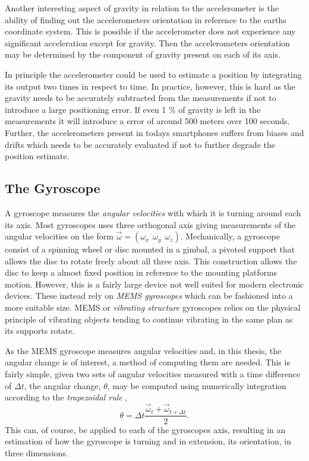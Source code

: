 \documentclass{LTHthesis}
\begin{document}
Another interesting aspect of gravity in relation to the accelerometer is the ability of finding out the accelerometers orientation in reference to the earths coordinate system. This is possible if the accelerometer does not experience any significant acceleration except for gravity. Then the accelerometers orientation may be determined by the component of gravity present on each of its axis. 

In principle the accelerometer could be used to estimate a position by integrating its output two times in respect to time. In practice, however, this is hard as the gravity needs to be accurately subtracted from the measurements if not to introduce a large positioning error. If even 1 \% of gravity is left in the measurements it will introduce a error of around 500 meters over 100 seconds. Further, the accelerometers present in todays smartphones suffers from biases and drifts which needs to be accurately evaluated if not to further degrade the position estimate. 
%
\subsection{The Gyroscope}
%
A gyroscope measures the \emph{angular velocities} with which it is turning around each its axis. Most gyroscopes uses three orthogonal axis giving measurements of the angular velocities on the form $\vec\omega = (\omega_x \hspace{5pt} \omega_y \hspace{5pt} \omega_z)$.  Mechanically, a gyroscope consist of a spinning wheel or disc mounted in a gimbal, a pivoted support that allows the disc to rotate freely about all three axis. This construction allows the disc to keep a almost fixed position in reference to the mounting platforms motion. However, this is a fairly large device not well suited for modern electronic devices. These instead rely on \emph{MEMS gyroscopes} which can be fashioned into a more suitable size. MEMS or \emph{vibrating structure} gyroscopes relies on the physical principle of vibrating objects tending to continue vibrating in the same plan as its supports rotate.  

As the MEMS gyroscope measures angular velocities and, in this thesis, the angular change is of interest, a method of computing them are needed. This is fairly simple, given two sets of angular velocities measured with a time difference of $\Delta t$, the angular change, $\theta$, may be computed using  numerically integration according to the \emph{trapezoidal rule} \cite{analysis},  
\begin{equation}
\theta=\Delta t \frac{\vec \omega _t +\vec \omega _{t+\Delta t}}{2}.\label{eq:trapetzoidal}
\end{equation} 
%
This can, of course, be applied to each of the gyroscopes axis, resulting in an estimation of how the gyroscope is turning and in extension, its orientation, in three dimensions. 
\end{document}
